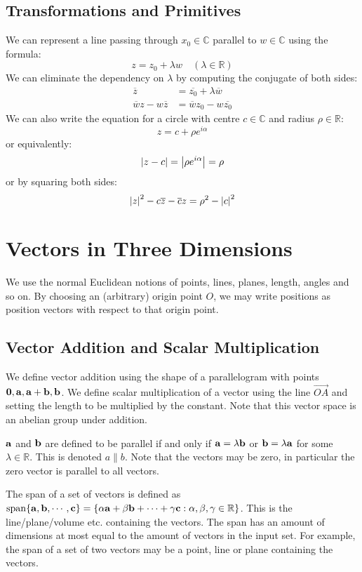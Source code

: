 \documentclass{article}
\begin{document}
\subsection{Transformations and Primitives}
We can represent a line passing through $x_0\in \mathbb C$ parallel to $w \in \mathbb C$ using the formula:
\[ z = z_0 + \lambda w\quad(\lambda \in \mathbb R) \]
We can eliminate the dependency on $\lambda$ by computing the conjugate of both sides:
\begin{align*}
    \overline{z}                  & = \overline{z_0} + \lambda \overline{w} \\
    \overline{w}z - w\overline{z} & = \overline{w}z_0 - w\overline{z_0}
\end{align*} %
We can also write the equation for a circle with centre $c \in \mathbb C$ and radius $\rho \in \mathbb R$:
\[ z = c + \rho e^{i\alpha} \]
or equivalently:
\[ \abs{z - c} = \abs{\rho e^{i\alpha}} = \rho \]
or by squaring both sides:
\[ \abs{z}^2 - c\overline{z} - \overline{c}z = \rho^2 - \abs{c}^2 \]

\section{Vectors in Three Dimensions}
We use the normal Euclidean notions of points, lines, planes, length, angles and so on. By choosing an (arbitrary) origin point $O$, we may write positions as position vectors with respect to that origin point.

\subsection{Vector Addition and Scalar Multiplication}
We define vector addition using the shape of a parallelogram with points $\vb 0, \vb a, \vb a + \vb b, \vb b$. We define scalar multiplication of a vector using the line $\overrightarrow{OA}$ and setting the length to be multiplied by the constant. Note that this vector space is an abelian group under addition.
\begin{definition}
    $\vb a$ and $\vb b$ are defined to be parallel if and only if $\vb a = \lambda \vb b$ or $\vb b = \lambda \vb a$ for some $\lambda \in \mathbb R$. This is denoted $a \parallel b$. Note that the vectors may be zero, in particular the zero vector is parallel to all vectors.
\end{definition}
\begin{definition}
    The span of a set of vectors is defined as $\operatorname{span} \{\vb a, \vb b, \cdots, \vb c\} = \{ \alpha \vb a + \beta \vb b + \cdots + \gamma \vb c: \alpha, \beta, \gamma \in \mathbb R \}$. This is the line/plane/volume etc. containing the vectors. The span has an amount of dimensions at most equal to the amount of vectors in the input set. For example, the span of a set of two vectors may be a point, line or plane containing the vectors.
\end{definition}
\end{document}
